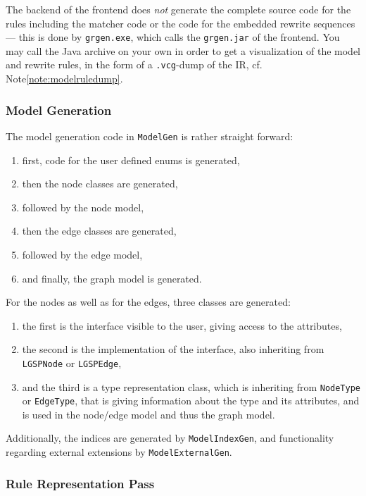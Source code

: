 The backend of the frontend does \emph{not} generate the complete source code for the rules including the matcher code or the code for the embedded rewrite sequences --- this is done by \texttt{grgen.exe}, which calls the \texttt{grgen.jar} of the frontend.
You may call the Java archive on your own in order to get a visualization of the model and rewrite rules, in the form of a \texttt{.vcg}-dump of the IR, cf. Note\ref{note:modelruledump}.


\subsubsection*{Model Generation}

The model generation code in \texttt{ModelGen} is rather straight forward:
\begin{enumerate}
	\item first, code for the user defined enums is generated,
	\item then the node classes are generated,
	\item followed by the node model,
	\item then the edge classes are generated,
	\item followed by the edge model,
	\item and finally, the graph model is generated.
\end{enumerate}

\noindent For the nodes as well as for the edges, three classes are generated:
\begin{enumerate}
	\item the first is the interface visible to the user, giving access to the attributes,
	\item the second is the implementation of the interface, also inheriting from \texttt{LGSPNode} or \texttt{LGSPEdge},
	\item and the third is a type representation class, which is inheriting from \texttt{NodeType} or \texttt{EdgeType}, that is giving information about the type and its attributes, and is used in the node/edge model and thus the graph model.
\end{enumerate}

Additionally, the indices are generated by \texttt{Model\-Index\-Gen}, and functionality regarding external extensions by \texttt{Model\-External\-Gen}.

\subsubsection*{Rule Representation Pass}

